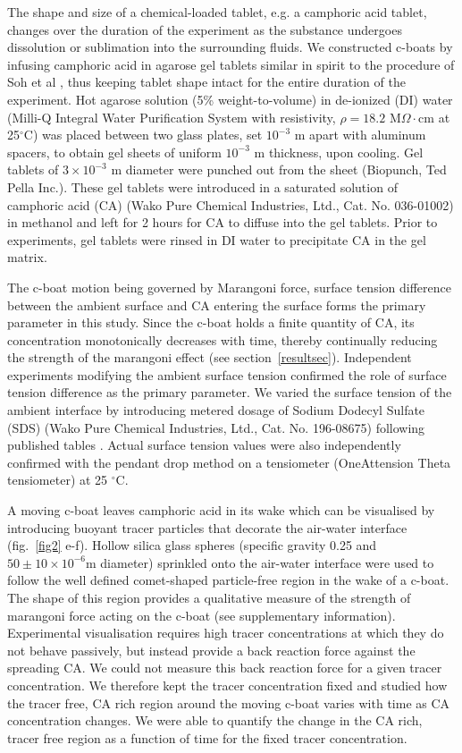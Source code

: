 \documentclass[journal=langd5, manuscript=article, layout=twocolumn]{achemso}
\begin{document}
The shape and size of a chemical-loaded tablet, e.g. a camphoric acid tablet, changes over the duration of the experiment as the substance undergoes dissolution or sublimation into the surrounding fluids. We constructed c-boats by infusing camphoric acid in agarose gel tablets similar in spirit to the procedure of Soh et al \cite{Soh2008}, thus keeping tablet shape intact for the entire duration of the experiment. Hot agarose solution (5\% weight-to-volume) in de-ionized (DI) water (Milli-Q Integral Water Purification System with resistivity, $\rho=18.2$ M$\Omega\cdot$cm at 25$^{\circ}$C) was placed between two glass plates, set $10^{-3}$ m apart with aluminum spacers, to obtain gel sheets of uniform $10^{-3}$ m thickness, upon cooling. Gel tablets of $3 \times 10^{-3}$ m diameter were punched out from the sheet (Biopunch, Ted Pella Inc.). These gel tablets were introduced in a saturated solution of camphoric acid (CA) (Wako Pure Chemical Industries, Ltd., Cat. No. 036-01002) in methanol and left for 2 hours for CA to diffuse into the gel tablets. Prior to experiments, gel tablets were rinsed in DI water to precipitate CA in the gel matrix. 

The c-boat motion being governed by Marangoni force, surface tension difference between the ambient surface and CA entering the surface forms the primary parameter in this study. Since the c-boat holds a finite quantity of CA, its concentration monotonically decreases with time, thereby continually reducing the strength of the marangoni effect (see section~\ref{resultsec}). Independent experiments modifying the ambient surface tension confirmed the role of surface tension difference as the primary parameter. We varied the surface tension of the ambient interface by introducing metered dosage of Sodium Dodecyl Sulfate (SDS) (Wako Pure Chemical Industries, Ltd., Cat. No. 196-08675) following published tables \cite{mysels1986}. Actual surface tension values were also independently confirmed with the pendant drop method on a tensiometer (OneAttension Theta tensiometer) at 25 $^{\circ}$C.


A moving c-boat leaves camphoric acid in its wake which can be visualised by introducing buoyant tracer particles that decorate the air-water interface (fig.~\ref{fig2} e-f). Hollow silica glass spheres (specific gravity 0.25 and $50 \pm 10 \times 10^{-6}$m diameter) sprinkled onto the air-water interface were used to follow the well defined comet-shaped particle-free region in the wake of a c-boat. The shape of this region provides a qualitative measure of the strength of marangoni force acting on the c-boat (see supplementary information). Experimental visualisation requires high tracer concentrations at which they do not behave passively, but instead provide a back reaction force against the spreading CA. We could not measure this back reaction force for a given tracer concentration. We therefore kept the tracer concentration fixed and studied how the tracer free, CA rich region around the moving c-boat varies with time as CA concentration changes. We were able to quantify the change in the CA rich, tracer free region as a function of time for the fixed tracer concentration.
\end{document}
